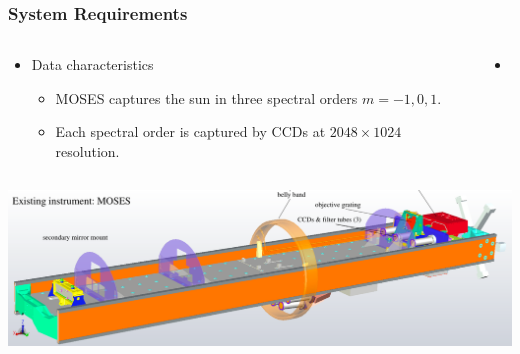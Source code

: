\documentclass[landscape,xcolor={table}]{beamer}
\begin{document}
	\begin{frame}
	
		\frametitle{System Requirements}
		
				\begin{columns}[T] %
				\begin{column}{.49\textwidth}
					\begin{itemize}
						\item Data characteristics
						\begin{itemize}
							\item MOSES captures the sun in three spectral orders $m=-1,0,1$.
							\item Each spectral order is captured by CCDs at $2048 \times 1024$ resolution.	
						\end{itemize}
					\end{itemize}
					
				\end{column}%
				\hfill%
				\begin{column}{.49\textwidth}
				
					\begin{itemize}
						\item
					\end{itemize}
				
				\end{column}%
				\end{columns}
		
		\includegraphics[width=\textwidth]{images/moses}

	\end{frame}
	
\end{document}
